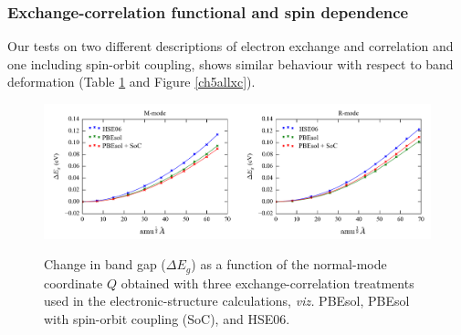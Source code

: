\subsubsection{Exchange-correlation functional and spin dependence}

Our tests on two different descriptions of electron exchange and correlation and one including spin-orbit coupling, shows similar behaviour with respect to band deformation (Table \ref{Egtheory} and Figure \ref{ch5allxc}). 
 
\begin{figure}[]
\includegraphics[width=\textwidth]{figures/ch5/fig_s4.png} \label{Egtheory}
\caption[Change in band gap as a function of normal mode coordinate at three levels of theory]{
Change in band gap ($\Delta E_g$) as a function of the normal-mode coordinate $Q$ obtained with three exchange-correlation treatments used in the electronic-structure calculations, \textit{viz.} PBEsol, PBEsol with spin-orbit coupling (SoC), and HSE06.
}
\end{figure}

